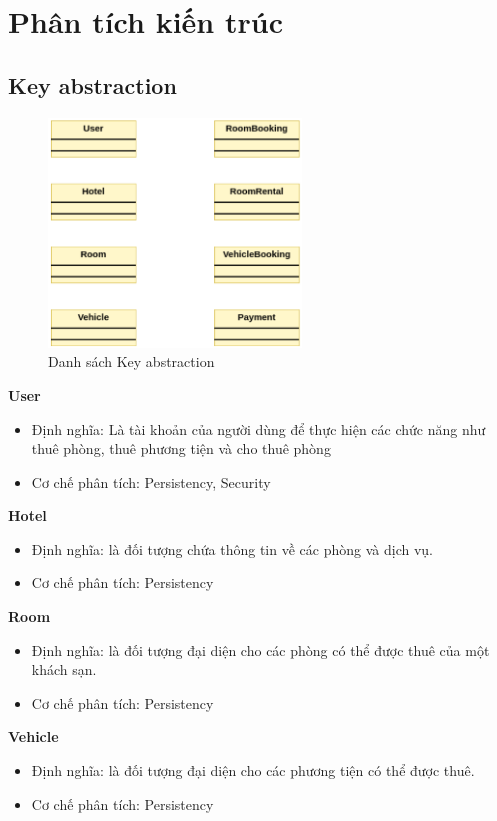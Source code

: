 \section{Phân tích kiến trúc}
\subsection{Key abstraction}
\begin{figure}[H]
    \centering
    \includegraphics[width=0.6\textwidth]{img2/Key abstraction.png} 
    \caption{Danh sách Key abstraction}
\end{figure}

\textbf{\indent User}
\begin{itemize}
    \item Định nghĩa: Là tài khoản của người dùng để thực hiện các chức năng như thuê phòng, thuê phương tiện và cho thuê phòng
    \item Cơ chế phân tích: Persistency, Security
\end{itemize}

\textbf{Hotel}
\begin{itemize}
    \item Định nghĩa: là đối tượng chứa thông tin về các phòng và dịch vụ.
    \item Cơ chế phân tích: Persistency
\end{itemize}

\textbf{Room}
\begin{itemize}
    \item Định nghĩa: là đối tượng đại diện cho các phòng có thể được thuê của một khách sạn.
    \item Cơ chế phân tích: Persistency
\end{itemize}

\textbf{Vehicle}
\begin{itemize}
    \item Định nghĩa: là đối tượng đại diện cho các phương tiện có thể được thuê.
    \item Cơ chế phân tích: Persistency
\end{itemize}

